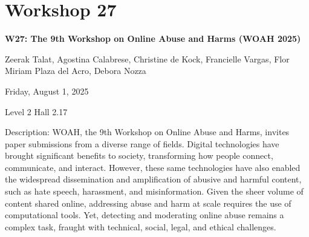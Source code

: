 \clearpage


\section[W27: The 9th Workshop on Online Abuse and Harms (WOAH 2025) ]{Workshop 27}
\label{workshop_27}

\begin{center}
    {\Large \textbf{W27: The 9th Workshop on Online Abuse and Harms (WOAH 2025) }}

Zeerak Talat, Agostina Calabrese, Christine de Kock, Francielle Vargas, Flor Miriam Plaza del Acro, Debora Nozza

    Friday, August 1, 2025

Level 2 Hall 2.17

\end{center}

Description: WOAH, the 9th Workshop on Online Abuse and Harms, invites paper submissions from a diverse range of fields. Digital technologies have brought significant benefits to society, transforming how people connect, communicate, and interact. However, these same technologies have also enabled the widespread dissemination and amplification of abusive and harmful content, such as hate speech, harassment, and misinformation. Given the sheer volume of content shared online, addressing abuse and harm at scale requires the use of computational tools. Yet, detecting and moderating online abuse remains a complex task, fraught with technical, social, legal, and ethical challenges. 

